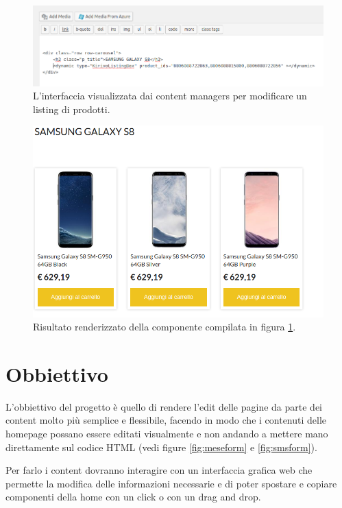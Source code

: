 \begin{figure}
  \includegraphics[width=\textwidth]{figure/sms-html.png}
  \caption{L'interfaccia visualizzata dai content managers per modificare un listing di prodotti.}
  \label{fig:smshtml}
\end{figure}

\begin{figure}
  \includegraphics[width=\textwidth]{figure/sms-render.png}
  \caption{Risultato renderizzato della componente compilata in figura \ref{fig:smshtml}.}
  \label{fig:smsrender}
\end{figure}


\newpage

\section{Obbiettivo}
L'obbiettivo del progetto è quello di rendere l'edit delle pagine
da parte dei content molto più semplice e flessibile,
facendo in modo che i contenuti delle homepage possano essere editati visualmente e non
andando a mettere mano direttamente sul codice HTML (vedi figure \ref{fig:meseform} e \ref{fig:smsform}).

Per farlo i content dovranno interagire con un interfaccia grafica web che permette
la modifica delle informazioni necessarie e di poter spostare e copiare
componenti della home con un click o con un drag and drop.


